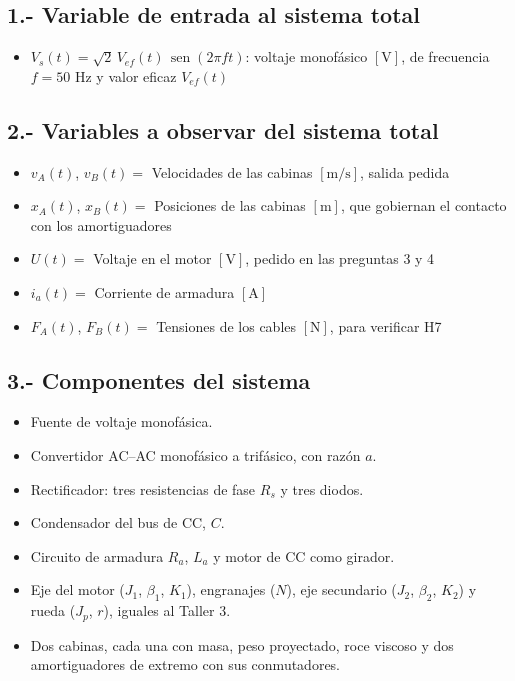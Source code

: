 \documentclass[10pt,a4paper,twocolumn]{article}
\DeclareMathOperator{\sen}{sen}
\begin{document}
\subsection*{1.- Variable de entrada al sistema total}
\begin{itemize}
  \item $V_s(t) = \sqrt{2}\,V_{ef}(t)\,\sen(2\pi f t)$: voltaje monofásico $[\mathrm{V}]$,
        de frecuencia $f = 50$ Hz y valor eficaz $V_{ef}(t)$
\end{itemize}

\subsection*{2.- Variables a observar del sistema total}
\begin{itemize}
  \item $v_A(t)$, $v_B(t) =$ Velocidades de las cabinas $[\mathrm{m/s}]$, salida pedida
  \item $x_A(t)$, $x_B(t) =$ Posiciones de las cabinas $[\mathrm{m}]$, que gobiernan el
        contacto con los amortiguadores
  \item $U(t) =$ Voltaje en el motor $[\mathrm{V}]$, pedido en las preguntas 3 y 4
  \item $i_a(t) =$ Corriente de armadura $[\mathrm{A}]$
  \item $F_A(t)$, $F_B(t) =$ Tensiones de los cables $[\mathrm{N}]$, para verificar H7
\end{itemize}

\subsection*{3.- Componentes del sistema}
\begin{itemize}
  \item Fuente de voltaje monofásica.
  \item Convertidor AC--AC monofásico a trifásico, con razón $a$.
  \item Rectificador: tres resistencias de fase $R_s$ y tres diodos.
  \item Condensador del bus de CC, $C$.
  \item Circuito de armadura $R_a$, $L_a$ y motor de CC como girador.
  \item Eje del motor ($J_1$, $\beta_1$, $K_1$), engranajes ($N$), eje secundario ($J_2$,
        $\beta_2$, $K_2$) y rueda ($J_p$, $r$), iguales al Taller 3.
  \item Dos cabinas, cada una con masa, peso proyectado, roce viscoso y dos amortiguadores
        de extremo con sus conmutadores.
\end{itemize}
\end{document}
